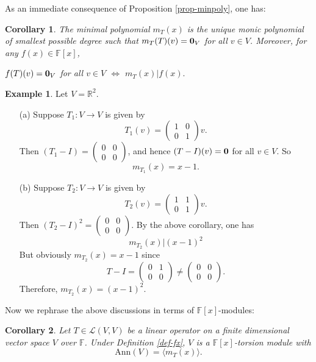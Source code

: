 \documentclass[11pt,openany]{book}
\theoremstyle{plain}
\newtheorem{corollary}[corollary]{Corollary}
\theoremstyle{definition}
\newtheorem{example}[example]{Example}
\theoremstyle{remark}
\begin{document}
As an immediate consequence of Proposition \ref{prop-minpoly}, one has:
\begin{corollary}
    The minimal polynomial $m_T(x)$ is the unique monic polynomial of smallest possible degree such that $m_T(T)(v) = {\bf 0}_V$ for all $v \in V$. Moreover, for any $f(x) \in \mathbb{F}[x]$,
    \begin{center}
    $f(T)(v) = {\bf 0}_V$ for all $v \in V$ \quad $\Leftrightarrow$ \quad
    $m_T(x) | f(x).$    
    \end{center}
    
\end{corollary}

\begin{example} \label{eg-2x2}
Let $V = \mathbb{R}^2$.
\begin{itemize}
    \item[(a)] Suppose $T_1: V \to V$ is given by 
    $$T_1(v) = \begin{pmatrix} 1 & 0 \\ 0 & 1 \end{pmatrix}v.$$ 
    Then
$(T_1 - I) = \begin{pmatrix} 0 & 0 \\ 0 & 0 \end{pmatrix}$, and hence $(T-I)(v) = {\bf 0}$
for all $v \in V$. So 
$$m_{T_1}(x) = x-1.$$
\item[(b)]   Suppose $T_2: V \to V$ is given by 
$$T_2(v) = \begin{pmatrix} 1 & 1 \\ 0 & 1 \end{pmatrix}v.$$ Then
$(T_2 - I)^2 = \begin{pmatrix} 0 & 0 \\ 0 & 0 \end{pmatrix}$. By the above corollary, one has
$$m_{T_2}(x) |  (x-1)^2$$
But obviously $m_{T_2}(x) = x-1$ since
$$T-I = \begin{pmatrix} 0 & 1 \\ 0 & 0 \end{pmatrix} \neq \begin{pmatrix} 0 & 0 \\ 0 & 0 \end{pmatrix}.$$
Therefore, $m_{T_2}(x) = (x-1)^2$.
\end{itemize}
\end{example}

Now we rephrase the above discussions in terms of $\mathbb{F}[x]$-modules:
\begin{corollary}
     Let $T \in \mathcal{L}(V,V)$ be a linear operator on a finite dimensional vector space $V$ over $\mathbb{F}$. Under Definition \ref{def-fx}, 
     $V$ is a $\mathbb{F}[x]$-torsion module with
     $$\mathrm{Ann}(V) = \langle m_T(x) \rangle.$$
\end{corollary}
\end{document}
